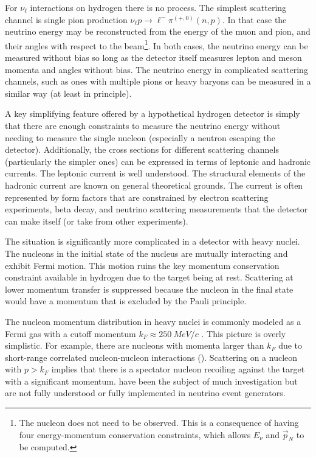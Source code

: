 For $\nu_\ell$ interactions on hydrogen there is no  process. The simplest scattering channel is single pion production $\nu_\ell p \to \ell^- \pi^{(+,0)} (n,p)$. In that case the neutrino energy may be reconstructed from the energy of the muon and pion, and their angles with respect to the beam\footnote{The nucleon does not need to be observed. This is a consequence of having four energy-momentum conservation constraints, which allows $E_\nu$ and $\vec{p}_N$ to be computed.}. In both cases, the neutrino energy can be measured without bias so long as the detector itself measures lepton and meson momenta and angles without bias.  The neutrino energy in complicated scattering channels, such as ones with multiple pions or heavy baryons can be measured in a similar way (at least in principle).

A key simplifying feature offered by a hypothetical hydrogen detector is simply that there are enough constraints to measure the neutrino energy without needing to measure the single nucleon (especially a neutron escaping the detector). Additionally, the cross sections for different scattering channels (particularly the simpler ones) can be expressed in terms of leptonic and hadronic currents. The leptonic current is well understood. The structural elements of the hadronic current are known on general theoretical grounds. The current is often represented by form factors that are constrained by electron scattering experiments, beta decay, and neutrino scattering measurements that the detector can make itself (or take from other experiments). 


The situation is significantly more complicated in a detector with heavy nuclei. The nucleons in the initial state of the nucleus are mutually interacting and exhibit Fermi motion. This motion ruins the key momentum conservation constraint available in hydrogen due to the target being at rest. Scattering at lower momentum transfer is suppressed because the nucleon in the final state would have a momentum that is excluded by the Pauli principle. 

The nucleon momentum distribution in heavy nuclei is commonly modeled as a Fermi gas with a cutoff momentum $k_F \approx \SI{250}{MeV/c}$ \cite{Smith:1972xh}.
This picture is overly simplistic.  For example,  there are nucleons with momenta larger than $k_F$ due to short-range correlated nucleon-nucleon interactions ()\cite{Bodek:2014jxa}. Scattering on a nucleon with $p>k_F$ implies that there is a spectator nucleon recoiling against the target with a significant momentum.  have been the subject of much investigation but are not fully understood or fully implemented in neutrino event generators.

